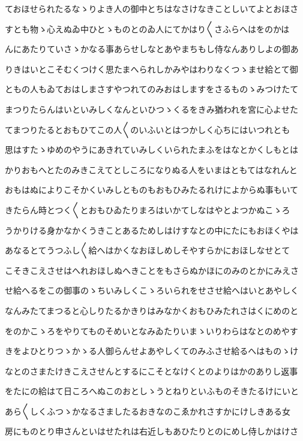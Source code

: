 \documentclass[a4paper,11pt,landscape]{ltjtarticle}
\begin{document}
ておほせられたるなゝりよき人の御中とちはなさけなきことしいてよとおほさ
\par\medskip
すとも物ゝ心えぬゐ中ひとゝものとのゐ人にてかはり〱さふらへはをのかは
\par\medskip
んにあたりていさゝかなる事あらせしなとあやまちもし侍なんありしよの御あ
\par\medskip
りきはいとこそむくつけく思たまへられしかみやはわりなくつゝませ給とて御
\par\medskip
ともの人もゐておはしまさすやつれてのみおはしますをさるものゝみつけたて
\par\medskip
まつりたらんはいといみしくなんといひつゝくるをきみ猶われを宮に心よせた
\par\medskip
てまつりたるとおもひてこの人〱のいふいとはつかしく心ちにはいつれとも
\par\medskip
思はすたゝゆめのやうにあきれていみしくいられたまふをはなとかくしもとは
\par\medskip
かりおもへとたのみきこえてとしころになりぬる人をいまはともてはなれんと
\par\medskip
おもはぬによりこそかくいみしとものもおもひみたるれけによからぬ事もいて
\par\medskip
きたらん時とつく〱とおもひゐたりまろはいかてしなはやとよつかぬこゝろ
\par\medskip
うかりける身かなかくうきことあるためしはけすなとの中にたにもおほくやは
\par\medskip
あなるとてうつふし〱給へはかくなおほしめしそやすらかにおほしなせとて
\par\medskip
こそきこえさせはへれおほしぬへきことをもさらぬかほにのみのとかにみえさ
\par\medskip
せ給へるをこの御事のゝちいみしくこゝろいられをせさせ給へはいとあやしく
\par\medskip
なんみたてまつると心しりたるかきりはみなかくおもひみたれさはくにめのと
\par\medskip
をのかこゝろをやりてものそめいとなみゐたりいまゝいりわらはなとのめやす
\par\medskip
きをよひとりつゝかゝる人御らんせよあやしくてのみふさせ給るへはものゝけ
\par\medskip
なとのさまたけきこえさせんとするにこそとなけくとのよりはかのありし返事
\par\medskip
をたにの給はて日ころへぬこのおとしゝうとねりといふものそきたるけにいと
\par\medskip
あら〱しくふつゝかなるさましたるおきなのこゑかれさすかにけしきある女
\par\medskip
房にものとり申さんといはせたれは右近しもあひたりとのにめし侍しかはけさ
\end{document}
